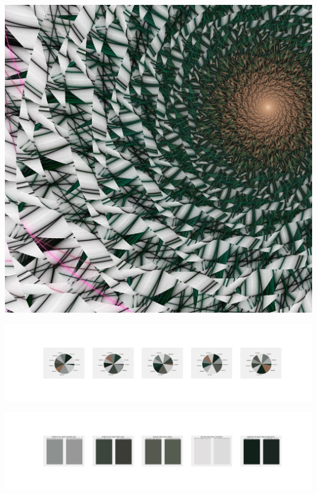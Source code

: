 \documentclass[11pt]{article}
\begin{document}
\begin{landscape}
    \begin{center}
    \includegraphics[width=\textwidth]{./nbimg/file (102).jpg}
    \end{center}

    \begin{center}
    \includegraphics[width=250mm]{./nbimg/pie-4.jpg}
    \end{center}

    \begin{center}
    \includegraphics[width=250mm]{./nbimg/peak-4.jpg}
    \end{center}
    


\end{landscape}
\end{document}
